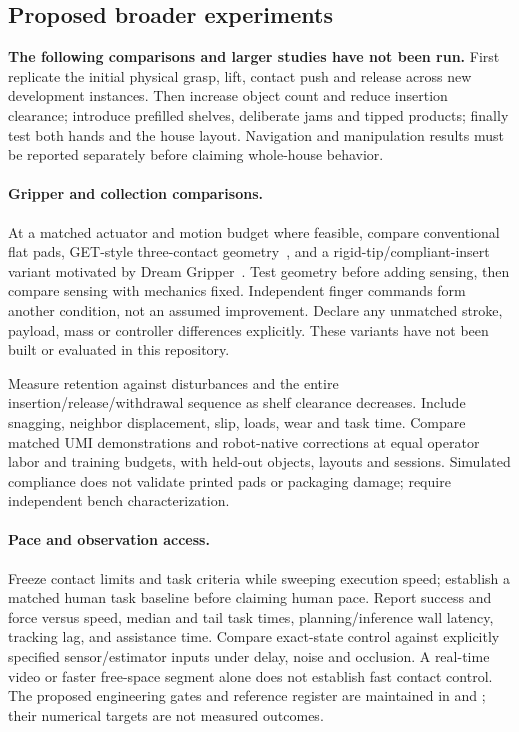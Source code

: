 \subsection{Proposed broader experiments}
\textbf{The following comparisons and larger studies have not been run.}
First replicate the initial physical grasp, lift, contact push and release across
new development instances. Then increase object count and reduce insertion clearance;
introduce prefilled shelves, deliberate jams and tipped products; finally test
both hands and the house layout. Navigation and manipulation results must be
reported separately before claiming whole-house behavior.

\paragraph{Gripper and collection comparisons.}
At a matched actuator and motion budget where feasible, compare conventional
flat pads, GET-style three-contact geometry~\citep{burgess2025get}, and a
rigid-tip/compliant-insert variant motivated by Dream Gripper~\citep{dreamgripper2026}.
Test geometry before adding sensing, then compare sensing with mechanics fixed.
Independent finger commands form another condition, not an assumed improvement.
Declare any unmatched stroke, payload, mass or controller differences explicitly.
These variants have not been built or evaluated in this repository.

Measure retention against disturbances and the entire insertion/release/withdrawal
sequence as shelf clearance decreases. Include snagging, neighbor displacement,
slip, loads, wear and task time. Compare matched UMI demonstrations and robot-native
corrections at equal operator labor and training budgets, with held-out objects,
layouts and sessions. Simulated compliance does not validate printed pads or
packaging damage; require independent bench characterization.

\paragraph{Pace and observation access.}
Freeze contact limits and task criteria while sweeping execution speed; establish
a matched human task baseline before claiming human pace. Report success and
force versus speed, median and tail task times, planning/inference wall latency,
tracking lag, and assistance time. Compare exact-state control against explicitly
specified sensor/estimator inputs under delay, noise and occlusion. A real-time
video or faster free-space segment alone does not establish fast contact control.
The proposed engineering gates and reference register are maintained in
 and ;
their numerical targets are not measured outcomes.

